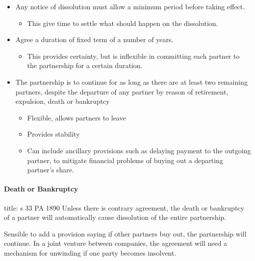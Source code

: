 \documentclass[
]{article}
\newenvironment{Shaded}{}{}
\newcommand{\NormalTok}[1]{#1}
\providecommand{\tightlist}{%
  \setlength{\itemsep}{0pt}\setlength{\parskip}{0pt}}
\begin{document}
\begin{itemize}
\tightlist
\item
  Any notice of dissolution must allow a minimum period before taking
  effect.

  \begin{itemize}
  \tightlist
  \item
    This give time to settle what should happen on the dissolution.
  \end{itemize}
\item
  Agree a duration of fixed term of a number of years.

  \begin{itemize}
  \tightlist
  \item
    This provides certainty, but is inflexible in committing each
    partner to the partnership for a certain duration.
  \end{itemize}
\item
  The partnership is to continue for as long as there are at least two
  remaining partners, despite the departure of any partner by reason of
  retirement, expulsion, death or bankruptcy

  \begin{itemize}
  \tightlist
  \item
    Flexible, allows partners to leave
  \item
    Provides stability
  \item
    Can include ancillary provisions such as delaying payment to the
    outgoing partner, to mitigate financial problems of buying out a
    departing partner's share.
  \end{itemize}
\end{itemize}

\hypertarget{death-or-bankruptcy}{%
\paragraph{Death or Bankruptcy}\label{death-or-bankruptcy}}

\begin{Shaded}
\begin{Highlighting}[]
\NormalTok{title: s 33 PA 1890}
\NormalTok{Unless there is contrary agreement, the death or bankruptcy of a partner will automatically cause dissolution of the entire partnership. }
\end{Highlighting}
\end{Shaded}

Sensible to add a provision saying if other partners buy out, the
partnership will continue. In a joint venture between companies, the
agreement will need a mechanism for unwinding if one party becomes
insolvent.
\end{document}
